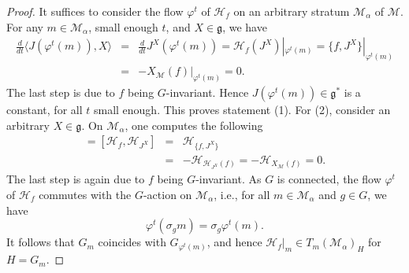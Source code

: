 \documentclass[12pt]{amsart}
\theoremstyle{definition}
\numberwithin{equation}{section}
\newcommand{\Hamiltonian}[1]{\mathcal{H}_{#1}}
\newcommand{\gstar}{\mathfrak{g}^*}
\newcommand{\galgebra}{\mathfrak{g}}
\newcommand{\PoissonBracket}[1]{\{#1\}}
\begin{document}
	\begin{proof} It suffices to consider the flow $\varphi^t$ of $\Hamiltonian{f}$ on  an arbitrary stratum $\mathcal{M}_{\alpha}$ of $\mathcal{M}$. For any $m\in \mathcal{M}_{\alpha}$, small enough $t$, and $X\in \galgebra$, we have
		\begin{eqnarray*}
			\frac{d}{dt}\langle J(\varphi^t(m)),X\rangle &=&  \frac{d}{dt}  J^X  (\varphi^t(m))
			= \Hamiltonian{f}(J^X)|_{\varphi^t(m)}=\PoissonBracket{f,J^X}|_{\varphi^t(m)}\\
			&=& - X_\mathcal{M}(f)|_{\varphi^t(m)}=0.
		\end{eqnarray*}
		The last step is due to $f$ being $G$-invariant.
		Hence $J(\varphi^t(m))\in \gstar$ is a constant, for all $t$ small enough. This proves statement (1). For (2),  consider an arbitrary $ X\in \galgebra$. On $\mathcal{M}_{\alpha}$, one computes the following
		\begin{eqnarray*}
			[\Hamiltonian{f}, X_\mathcal{M} ]=[\Hamiltonian{f}, \Hamiltonian{J^X} ]&=& \Hamiltonian{\PoissonBracket{f,J^X}}\\
			&=&-\Hamiltonian{\Hamiltonian{J^X}(f)}=-\Hamiltonian{X_\mathcal{M}(f)}=0.
		\end{eqnarray*}  
		The last step is again due to $f$ being $G$-invariant. As $G$ is connected, the flow $\varphi^t$ of $\Hamiltonian{f}$ commutes with the $G$-action on $\mathcal{M}_{\alpha}$, i.e., for all $m\in \mathcal{M}_{\alpha}$ and $g\in G$, we have 
		$$
		\varphi^t(\sigma_g m)=\sigma_g \varphi^t(m).
		$$
		It follows that $G_m$ coincides with $G_{\varphi^t(m)}$, and hence  $\Hamiltonian{f}|_m\in T_m (\mathcal{M}_{\alpha})_H$ for $H=G_m$.
		
	\end{proof}
	
\end{document}
